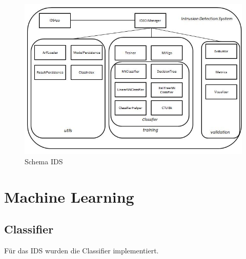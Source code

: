 \documentclass[main.tex]{subfiles}
\begin{document}
\begin{figure}[ht]
 \centering
 \includegraphics[width=1\textwidth]{images/Schema_IDS.jpg}
 \caption{Schema IDS}
 \label{schema_ids}
\end{figure}


\section{Machine Learning}
\subsection{Classifier}
Für das IDS wurden die Classifier implementiert.
\end{document}
